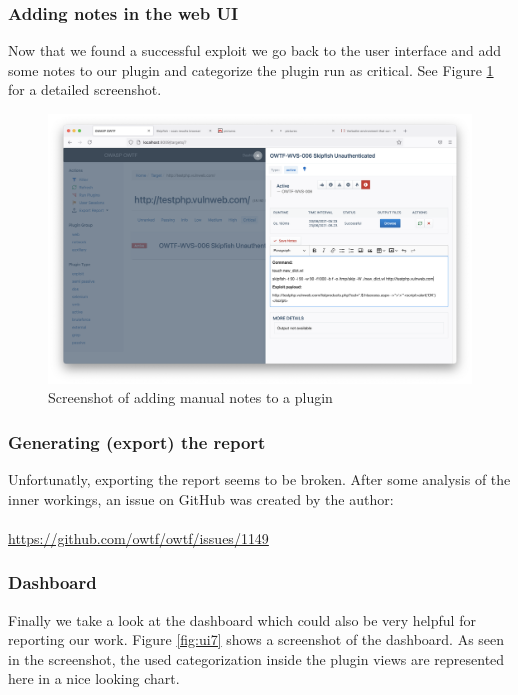\subsubsection{Adding notes in the web UI}

Now that we found a successful exploit we go back to the user interface and add some notes to our plugin and categorize the plugin run as critical. See Figure \ref{fig:ui6} for a detailed screenshot.

\begin{figure}[H]
	\centering
	\includegraphics[width=12cm,keepaspectratio=true]{pictures/ui6.png}
	\caption{
		Screenshot of adding manual notes to a plugin
	}
	\label{fig:ui6}
\end{figure}

\subsubsection{Generating (export) the report}

Unfortunatly, exporting the report seems to be broken. After some analysis of the inner workings, an issue on GitHub was created by the author:\\\\ \href{https://github.com/owtf/owtf/issues/1149}{https://github.com/owtf/owtf/issues/1149}

\subsubsection{Dashboard}

Finally we take a look at the dashboard which could also be very helpful for reporting our work. Figure \ref{fig:ui7} shows a screenshot of the dashboard. As seen in the screenshot, the used categorization inside the plugin views are represented here in a nice looking chart.

